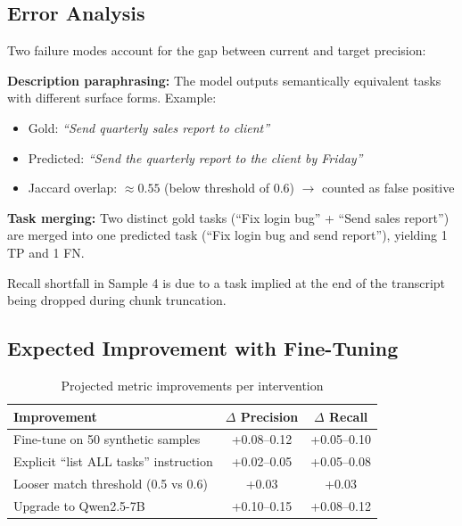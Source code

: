 \documentclass[12pt,a4paper]{article}
\begin{document}
\subsection{Error Analysis}

Two failure modes account for the gap between current and target precision:

\textbf{Description paraphrasing:} The model outputs semantically equivalent tasks with different surface forms. Example:
\begin{itemize}
    \item Gold: \textit{``Send quarterly sales report to client''}
    \item Predicted: \textit{``Send the quarterly report to the client by Friday''}
    \item Jaccard overlap: $\approx 0.55$ (below threshold of 0.6) $\rightarrow$ counted as false positive
\end{itemize}

\textbf{Task merging:} Two distinct gold tasks (``Fix login bug'' + ``Send sales report'') are merged into one predicted task (``Fix login bug and send report''), yielding 1 TP and 1 FN.

Recall shortfall in Sample 4 is due to a task implied at the end of the transcript being dropped during chunk truncation.

\subsection{Expected Improvement with Fine-Tuning}

\begin{table}[H]
\centering
\begin{tabular}{lcc}
\toprule
\textbf{Improvement} & \textbf{$\Delta$ Precision} & \textbf{$\Delta$ Recall} \\
\midrule
Fine-tune on 50 synthetic samples & +0.08–0.12 & +0.05–0.10 \\
Explicit ``list ALL tasks'' instruction & +0.02–0.05 & +0.05–0.08 \\
Looser match threshold (0.5 vs 0.6) & +0.03 & +0.03 \\
Upgrade to Qwen2.5-7B & +0.10–0.15 & +0.08–0.12 \\
\bottomrule
\end{tabular}
\caption{Projected metric improvements per intervention}
\end{table}

\end{document}

